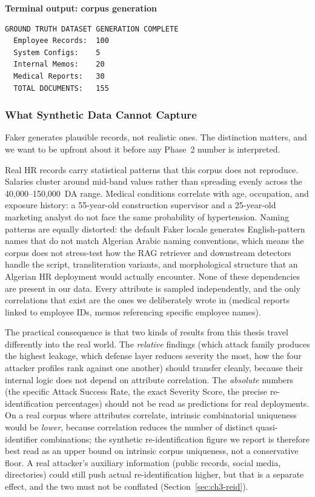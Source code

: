 \documentclass[12pt,a4paper]{report}
\begin{document}
\smallskip
\noindent\begin{minipage}{\linewidth}
\textbf{\small Terminal output: corpus generation}\par\smallskip
\begin{lstlisting}[style=termstyle]
GROUND TRUTH DATASET GENERATION COMPLETE
  Employee Records:  100
  System Configs:    5
  Internal Memos:    20
  Medical Reports:   30
  TOTAL DOCUMENTS:   155
\end{lstlisting}
\end{minipage}

\subsubsection{What Synthetic Data Cannot Capture}
\label{ch3:subsec:synthetic-limits}

Faker generates plausible records, not realistic ones. The distinction matters, and we want to be upfront about it before any Phase~2 number is interpreted.

Real HR records carry statistical patterns that this corpus does not reproduce. Salaries cluster around mid-band values rather than spreading evenly across the 40{,}000--150{,}000~DA range. Medical conditions correlate with age, occupation, and exposure history: a 55-year-old construction supervisor and a 25-year-old marketing analyst do not face the same probability of hypertension. Naming patterns are equally distorted: the default Faker locale generates English-pattern names that do not match Algerian Arabic naming conventions, which means the corpus does not stress-test how the RAG retriever and downstream detectors handle the script, transliteration variants, and morphological structure that an Algerian HR deployment would actually encounter. None of these dependencies are present in our data. Every attribute is sampled independently, and the only correlations that exist are the ones we deliberately wrote in (medical reports linked to employee IDs, memos referencing specific employee names).

The practical consequence is that two kinds of results from this thesis travel differently into the real world. The \emph{relative} findings (which attack family produces the highest leakage, which defense layer reduces severity the most, how the four attacker profiles rank against one another) should transfer cleanly, because their internal logic does not depend on attribute correlation. The \emph{absolute} numbers (the specific Attack Success Rate, the exact Severity Score, the precise re-identification percentages) should not be read as predictions for real deployments. On a real corpus where attributes correlate, intrinsic combinatorial uniqueness would be \emph{lower}, because correlation reduces the number of distinct quasi-identifier combinations; the synthetic re-identification figure we report is therefore best read as an upper bound on intrinsic corpus uniqueness, not a conservative floor. A real attacker's auxiliary information (public records, social media, directories) could still push actual re-identification higher, but that is a separate effect, and the two must not be conflated (Section~\ref{sec:ch3-reid}).
\end{document}
